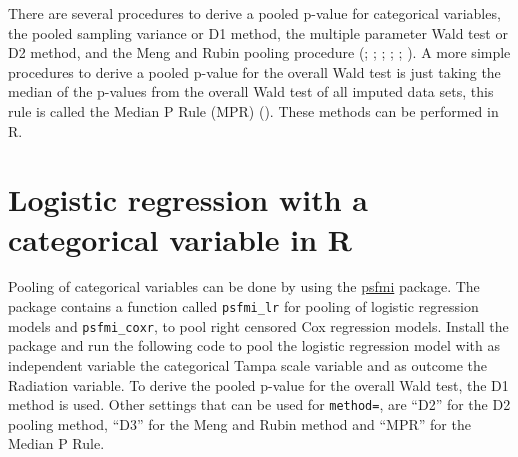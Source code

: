\documentclass[
]{book}
\newenvironment{Shaded}{\begin{snugshade}}{\end{snugshade}}
\newcommand{\AttributeTok}[1]{\textcolor[rgb]{0.77,0.63,0.00}{#1}}
\newcommand{\DecValTok}[1]{\textcolor[rgb]{0.00,0.00,0.81}{#1}}
\newcommand{\FunctionTok}[1]{\textcolor[rgb]{0.00,0.00,0.00}{#1}}
\newcommand{\NormalTok}[1]{#1}
\newcommand{\OtherTok}[1]{\textcolor[rgb]{0.56,0.35,0.01}{#1}}
\newcommand{\SpecialCharTok}[1]{\textcolor[rgb]{0.00,0.00,0.00}{#1}}
\newcommand{\StringTok}[1]{\textcolor[rgb]{0.31,0.60,0.02}{#1}}
\begin{document}
There are several procedures to derive a pooled p-value for categorical variables, the pooled sampling variance or D1 method, the multiple parameter Wald test or D2 method, and the Meng and Rubin pooling procedure (\citet{VanBuuren2018}; \citet{enders2010applied}; \citet{Eekhout2017}; \citet{Meng1992}; \citet{Mistler2013}; \citet{Marshall2009MedResMeth}). A more simple procedures to derive a pooled p-value for the overall Wald test is just taking the median of the p-values from the overall Wald test of all imputed data sets, this rule is called the Median P Rule (MPR) (\citet{Eekhout2017}). These methods can be performed in R.

\hypertarget{logistic-regression-with-a-categorical-variable-in-r}{%
\section{Logistic regression with a categorical variable in R}\label{logistic-regression-with-a-categorical-variable-in-r}}

Pooling of categorical variables can be done by using the \href{https://mwheymans.github.io/psfmi/}{psfmi} package. The package contains a function called \texttt{psfmi\_lr} for pooling of logistic regression models and \texttt{psfmi\_coxr}, to pool right censored Cox regression models. Install the package and run the following code to pool the logistic regression model with as independent variable the categorical Tampa scale variable and as outcome the Radiation variable. To derive the pooled p-value for the overall Wald test, the D1 method is used. Other settings that can be used for \texttt{method=}, are ``D2'' for the D2 pooling method, ``D3'' for the Meng and Rubin method and ``MPR'' for the Median P Rule.

\begin{Shaded}
\end{Shaded}
\end{document}
